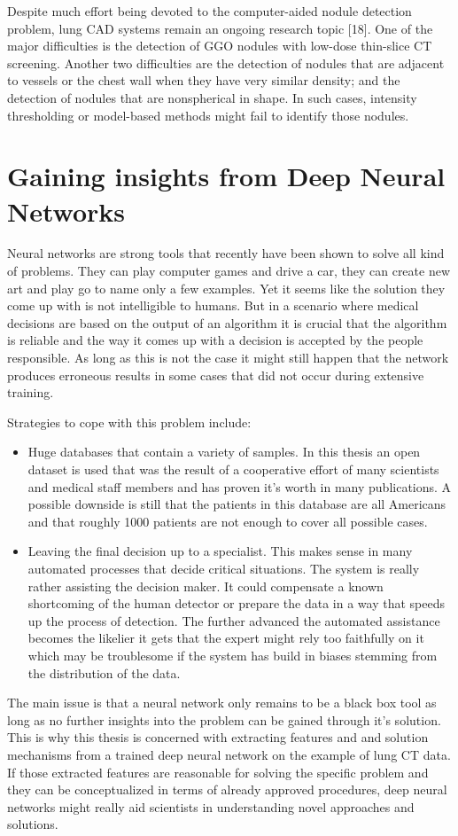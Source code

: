 \documentclass[main.tex]{subfiles}
\begin{document}
Despite much effort being devoted to the computer-aided nodule detection problem, lung CAD systems remain an ongoing
research topic [18]. One of the major difficulties is the detection of GGO nodules with low-dose thin-slice CT screening. Another two difficulties are the detection of nodules that are adjacent to vessels or the chest wall when they have very similar density; and the detection of nodules that are nonspherical in shape. In such cases, intensity thresholding or model-based methods might fail to identify those nodules.

\section{Gaining insights from Deep Neural Networks}
Neural networks are strong tools that recently have been shown to solve all kind of problems. They can play
computer games and drive a car, they can create new art and play go to name only a few examples. Yet it seems like the solution they come up with is not intelligible to humans. But in a scenario where medical decisions are based on the output of an algorithm it is crucial that the algorithm is reliable and the way it comes up with a decision is accepted by the people responsible. As long as this is not the case it might still happen that the network produces erroneous results in some cases that did not occur during extensive training.

Strategies to cope with this problem include:
\begin{itemize}
\item Huge databases that contain a variety of samples. In this thesis an open dataset is used that was
the result of a cooperative effort of many scientists and medical staff members and has proven
it's worth in many publications. A possible downside is still that the patients in this database are all Americans and that roughly 1000 patients are not enough to cover all possible cases.

\item Leaving the final decision up to a specialist. This makes sense in many automated processes that decide critical situations. The system is really rather assisting the decision maker. It could compensate a known shortcoming of the human detector or prepare the data in a way that speeds up the process of detection. The further advanced the automated assistance becomes the likelier it gets that the expert might rely too faithfully on it which may be troublesome if the system has build in biases stemming from the distribution of the data.
\end{itemize}

The main issue is that a neural network only remains to be a black box tool as long as no further insights into
the problem can be gained through it's solution. This is why this thesis is concerned with extracting
features and and solution mechanisms from a trained deep neural network on the example of lung CT data. If those extracted features are reasonable for solving the specific problem and they can be conceptualized in terms of already approved procedures, deep neural networks might really aid scientists in understanding novel approaches and solutions.
\end{document}
